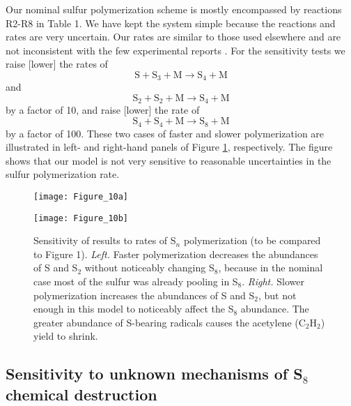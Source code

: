 \documentclass[preprint]{aastex6}
\newcounter{reaction}
\begin{document}
Our nominal sulfur polymerization scheme is mostly encompassed by reactions R2-R8 in Table 1.
We have kept the system simple because the reactions and rates are very uncertain.
Our rates are similar to those used elsewhere \citep[e.g.,][]{Moses2002,Yung2009} and are not inconsistent
with the few experimental reports \citep{Fair1969,Langford1972,Langford1973,Nicholas1979}.
For the sensitivity tests we raise [lower] the rates of
\begin{equation}\tag{R4}
\mathrm{S}+\mathrm{S}_3+\mathrm{M} \rightarrow \mathrm{S}_4 +\mathrm{M}
\end{equation}
and 
\begin{equation}\tag{R5}
\mathrm{S}_2+\mathrm{S}_2+\mathrm{M} \rightarrow \mathrm{S}_4 +\mathrm{M}
\end{equation}
by a factor of 10, and raise [lower] the rate of
\begin{equation}\tag{R7}
 \mathrm{S}_4+\mathrm{S}_4+\mathrm{M} \rightarrow \mathrm{S}_8 +\mathrm{M}
\end{equation}
 by a factor of 100. 
 These two cases of faster and slower polymerization are illustrated in left- and right-hand
 panels of Figure \ref{polymerize}, respectively.
 The figure shows that our model is not very sensitive to reasonable uncertainties in the sulfur polymerization rate.

\begin{figure}[!htb]
 \centering
 \begin{minipage}[c]{0.49\textwidth}
   \centering
  \texttt{[image: Figure\_10a]} 
 \end{minipage}
 \begin{minipage}[c]{0.49\textwidth}
   \centering
 \texttt{[image: Figure\_10b]} 
 \end{minipage}
  \caption{\small Sensitivity of results to rates of S$_n$ polymerization (to be compared to Figure 1).
   {\it Left.} Faster polymerization decreases the abundances of S and S$_2$ without noticeably changing
   S$_8$, because in the nominal case most of the sulfur was already pooling in S$_8$.
  {\it Right.} Slower polymerization increases the abundances of S and S$_2$, but not enough in this model
  to noticeably affect the S$_8$ abundance.  The greater abundance of S-bearing radicals 
  causes the acetylene (C$_2$H$_2$) yield to shrink.
  }
\label{polymerize}
\end{figure}

\subsection{Sensitivity to unknown mechanisms of S$_8$ chemical destruction}
\end{document}
